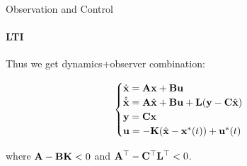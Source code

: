 \documentclass{beamer}
\begin{document}
\begin{frame}{Observation and Control}
\framesubtitle{LTI}
\begin{flushleft}

Thus we get dynamics+observer combination:

\begin{equation}
\begin{cases}
\dot {\mathbf{x}} = \mathbf{A} \mathbf{x} + \mathbf{B} \mathbf{u} \\
\hat{\dot {\mathbf{x}}} = \mathbf{A} \hat{\mathbf{x}} + \mathbf{B} \mathbf u + \mathbf{L}(\mathbf y - \mathbf{C} \hat{\mathbf{x}})\\
\mathbf{y} = \mathbf{C} \mathbf{x} \\
\mathbf{u} = -\mathbf{K} (\hat{\mathbf{x}} - \mathbf{x}^*(t)) + \mathbf{u}^*(t)
\end{cases}
\end{equation}

\bigskip

where $\mathbf{A} - \mathbf{B} \mathbf{K} < 0$ and $\mathbf{A}^{\top} - 
\mathbf{C}^{\top} \mathbf{L}^{\top} < 0$.


\end{flushleft}
\end{frame}
\end{document}
